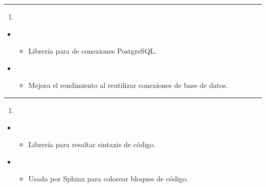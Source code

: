 \documentclass[a4paper,10pt,spanish]{sphinxmanual}
\begin{document}
\bigskip\hrule\bigskip

\begin{enumerate}
%
\setcounter{enumi}{20}
\item {} 
\sphinxAtStartPar
{}

\end{enumerate}
\begin{itemize}
\item {} 
\sphinxAtStartPar
{}
\begin{itemize}
\item {} 
\sphinxAtStartPar
Librería para  de conexiones PostgreSQL.

\end{itemize}

\item {} 
\sphinxAtStartPar
{}
\begin{itemize}
\item {} 
\sphinxAtStartPar
Mejora el rendimiento al reutilizar conexiones de base de datos.

\end{itemize}

\end{itemize}


\bigskip\hrule\bigskip

\begin{enumerate}
%
\setcounter{enumi}{21}
\item {} 
\sphinxAtStartPar
{}

\end{enumerate}
\begin{itemize}
\item {} 
\sphinxAtStartPar
{}
\begin{itemize}
\item {} 
\sphinxAtStartPar
Librería para resaltar sintaxis de código.

\end{itemize}

\item {} 
\sphinxAtStartPar
{}
\begin{itemize}
\item {} 
\sphinxAtStartPar
Usada por Sphinx para colorear bloques de código.

\end{itemize}

\end{itemize}
\end{document}
